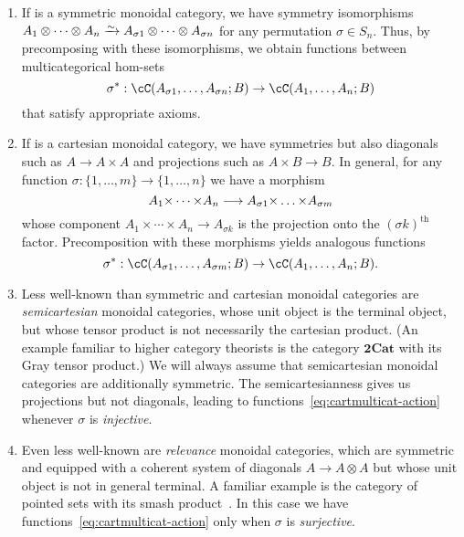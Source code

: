 \documentclass{book}
\let\tensor\otimes
\begin{document}
\begin{enumerate}
\item If \cC is a symmetric monoidal category, we have symmetry isomorphisms $A_1\tensor\cdots\tensor A_n\toiso A_{\sigma 1}\tensor\cdots\tensor A_{\sigma n}$ for any permutation $\sigma\in S_n$.
  Thus, by precomposing with these isomorphisms, we obtain functions between multicategorical hom-sets
  \begin{equation}
    \sigma^*: \cC(A_{\sigma 1},\dots,A_{\sigma n}; B) \to \cC(A_1,\dots,A_n;B)\label{eq:symm-multicat-action}
  \end{equation}
  that satisfy appropriate axioms.
\item If \cC is a cartesian monoidal category, we have symmetries but also diagonals such as $A\to A\times A$ and projections such as $A\times B \to B$.
  In general, for any function $\sigma : \{1,\dots,m\} \to \{1,\dots,n\}$ we have a morphism
  \[ A_1\times \cdots\times A_n \too A_{\sigma 1} \times\dots\times A_{\sigma m} \]
  whose component $A_1\times \cdots\times A_n \to A_{\sigma k}$ is the projection onto the $(\sigma k)^{\mathrm{th}}$ factor.
  Precomposition with these morphisms yields analogous functions
  \begin{equation}
    \sigma^*: \cC(A_{\sigma 1},\dots,A_{\sigma m}; B) \to \cC(A_1,\dots,A_n;B).\label{eq:cartmulticat-action}
  \end{equation}
\item Less well-known than symmetric and cartesian monoidal categories are \emph{semicartesian} monoidal categories, whose unit object is the terminal object, but whose tensor product is not necessarily the cartesian product.
  (An example familiar to higher category theorists is the category $\mathbf{2Cat}$ with its Gray tensor product.)
  We will always assume that semicartesian monoidal categories are additionally symmetric.
  The semicartesianness gives us projections but not diagonals, leading to functions~\eqref{eq:cartmulticat-action} whenever $\sigma$ is \emph{injective}.
\item Even less well-known are \emph{relevance} monoidal categories, which are symmetric and equipped with a coherent system of diagonals $A \to A\tensor A$ but whose unit object is not in general terminal.
  A familiar example is the category of pointed sets with its smash product~\cite{dp:relevant-cats}.
  In this case we have functions~\eqref{eq:cartmulticat-action} only when $\sigma$ is \emph{surjective}.
\end{enumerate}
\end{document}
